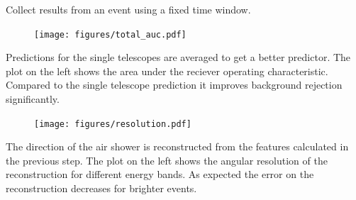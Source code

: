 \begin{multicols}{2}
\begin{center}
        \begin{streamblock}[height=2.1cm, colframe=white!60!black,, width=0.8\linewidth]{-5mm}{0}{}%
          \begin{center}
            Collect results from an event using a fixed time window.
          \end{center}
        \end{streamblock}%

        \begin{streamblock}[equal height group=C, width=0.8\linewidth]{0mm}{-5mm}{}%
          \begin{multicols}{2}
            \begin{figure}
              \texttt{[image: figures/total\_auc.pdf]}
            \end{figure}
            \columnbreak
            Predictions for the single telescopes are averaged to get a better predictor.
            The plot on the left shows the area under the reciever operating characteristic.
            Compared to the single telescope prediction it improves background rejection significantly.
          \end{multicols}
        \end{streamblock}%

        \begin{streamblock}[equal height group=C, width=0.8\linewidth]{-5mm}{-5mm}{}%
          \begin{multicols}{2}
            \begin{figure}
              \texttt{[image: figures/resolution.pdf]}
            \end{figure}
            \columnbreak
            The direction of the air shower is reconstructed from the features calculated in the previous step.
            The plot on the left shows the angular resolution of the reconstruction for different energy bands.
            As expected the error on the reconstruction decreases for brighter events.
          \end{multicols}
        \end{streamblock}%


\end{center}
\end{multicols}
